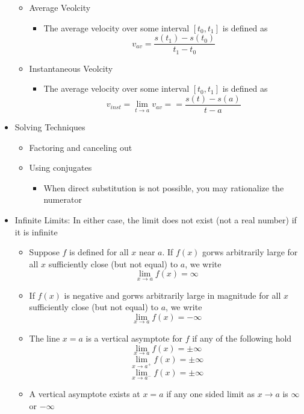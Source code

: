 \documentclass{article}
\begin{document}
\begin{itemize}
        \begin{itemize}
            \item Average Veolcity
            \begin{itemize}
                \item The average velocity over some interval $[t_0, t_1]$ is defined as
                $$v_{av} = \frac{s(t_1) - s(t_0)}{t_1 - t_0}$$
            \end{itemize}
            \item Instantaneous Veolcity
            \begin{itemize}
                \item The average velocity over some interval $[t_0, t_1]$ is defined as
                $$v_{inst} = \lim_{t \to a}{v_{av}} = = \frac{s(t) - s(a)}{t - a}$$
            \end{itemize}
        \end{itemize}
    \item Solving Techniques
        \begin{itemize}
    	    \item Factoring and canceling out
    	    \item Using conjugates
            \begin{itemize}
    	    	\item When direct substitution is not possible, you may rationalize the numerator
            \end{itemize}
        \end{itemize}
	\item Infinite Limits: In either case, the limit does not exist (not a real number) if it is infinite
	\begin{itemize}
		\item Suppose $f$ is defined for all $x$ near $a$. If $f(x)$ gorws arbitrarily large for all $x$ sufficiently close (but not equal) to $a$, we write
		$$\lim_{x \to a}{f(x)} = \infty$$
		\item If $f(x)$ is negative and gorws arbitrarily large in magnitude for all $x$ sufficiently close (but not equal) to $a$, we write
		$$\lim_{x \to a}{f(x)} = - \infty$$
		\item The line $x = a$ is a vertical asymptote for $f$ if any of the following hold
		$$\lim_{x \to a}{f(x)} = \pm \infty$$
		$$\lim_{x \to a^+}{f(x)} = \pm \infty$$
		$$\lim_{x \to a^-}{f(x)} = \pm \infty$$
		\item A vertical asymptote exists at $x = a$ if any one sided limit as $x \to a$ is $\infty$ or $- \infty$

\end{itemize}
\end{itemize}
\end{document}

